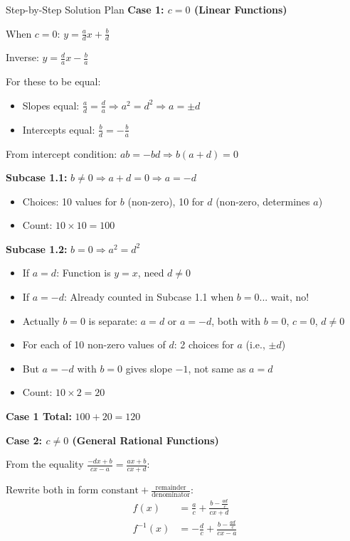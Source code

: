 \documentclass[12pt]{article}
\begin{document}
\begin{roadmapbox}{Step-by-Step Solution Plan}
\textbf{Case 1: $c=0$ (Linear Functions)}

When $c=0$: $y = \frac{a}{d}x + \frac{b}{d}$

Inverse: $y = \frac{d}{a}x - \frac{b}{a}$

For these to be equal:
\begin{itemize}
    \item Slopes equal: $\frac{a}{d} = \frac{d}{a} \Rightarrow a^2 = d^2 \Rightarrow a = \pm d$
    \item Intercepts equal: $\frac{b}{d} = -\frac{b}{a}$
\end{itemize}

From intercept condition: $ab = -bd \Rightarrow b(a+d) = 0$

\textbf{Subcase 1.1:} $b \neq 0 \Rightarrow a+d=0 \Rightarrow a=-d$
\begin{itemize}
    \item Choices: 10 values for $b$ (non-zero), 10 for $d$ (non-zero, determines $a$)
    \item Count: $10 \times 10 = 100$
\end{itemize}

\textbf{Subcase 1.2:} $b=0 \Rightarrow a^2=d^2$
\begin{itemize}
    \item If $a=d$: Function is $y=x$, need $d \neq 0$
    \item If $a=-d$: Already counted in Subcase 1.1 when $b=0$... wait, no!
    \item Actually $b=0$ is separate: $a=d$ or $a=-d$, both with $b=0$, $c=0$, $d \neq 0$
    \item For each of 10 non-zero values of $d$: 2 choices for $a$ (i.e., $\pm d$)
    \item But $a=-d$ with $b=0$ gives slope $-1$, not same as $a=d$
    \item Count: $10 \times 2 = 20$
\end{itemize}

\textbf{Case 1 Total:} $100 + 20 = 120$

\textbf{Case 2: $c \neq 0$ (General Rational Functions)}

From the equality $\frac{-dx+b}{cx-a} = \frac{ax+b}{cx+d}$:

Rewrite both in form $\text{constant} + \frac{\text{remainder}}{\text{denominator}}$:
\begin{align*}
f(x) &= \frac{a}{c} + \frac{b - \frac{ad}{c}}{cx+d}\\
f^{-1}(x) &= -\frac{d}{c} + \frac{b - \frac{ad}{c}}{cx-a}
\end{align*}


\end{roadmapbox}
\end{document}
